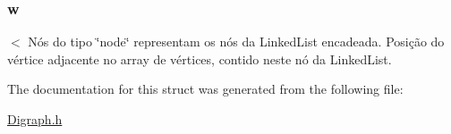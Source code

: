 \subsubsection[{\texorpdfstring{w}{w}}]{ w}\hypertarget{structnode_ac6c3e84cdc714053b54b0d3e63abc3b3}{}\label{structnode_ac6c3e84cdc714053b54b0d3e63abc3b3}
$<$ Nós do tipo \char`\"{}node\char`\"{} representam os nós da Linked\+List encadeada. Posição do vértice adjacente no array de vértices, contido neste nó da Linked\+List. 

The documentation for this struct was generated from the following file\+:\begin{DoxyCompactItemize}
\item 
\hyperlink{_digraph_8h}{Digraph.\+h}\end{DoxyCompactItemize}

